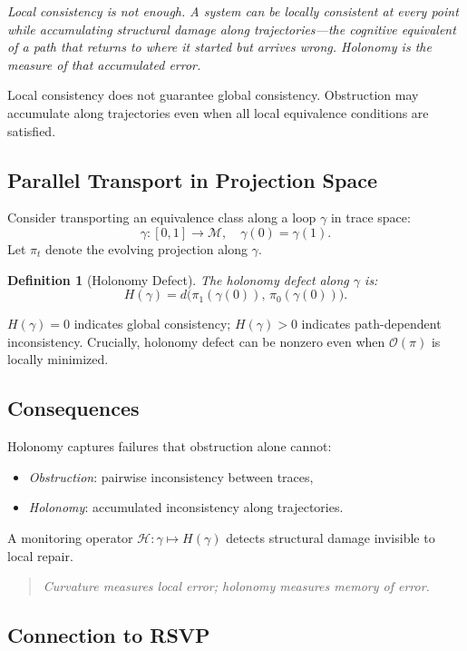 \documentclass[12pt,a4paper]{article}
\newtheorem{definition}[theorem]{Definition}
\begin{document}
\textit{Local consistency is not enough. A system can be locally consistent at every point while accumulating structural damage along trajectories---the cognitive equivalent of a path that returns to where it started but arrives wrong. Holonomy is the measure of that accumulated error.}

Local consistency does not guarantee global consistency. Obstruction may accumulate along trajectories even when all local equivalence conditions are satisfied.

\subsection{Parallel Transport in Projection Space}

Consider transporting an equivalence class along a loop $\gamma$ in trace space:
\[
\gamma : [0,1] \to \mathcal{M}, \quad \gamma(0) = \gamma(1).
\]
Let $\pi_t$ denote the evolving projection along $\gamma$.

\begin{definition}[Holonomy Defect]
The holonomy defect along $\gamma$ is:
\[
H(\gamma) = d\bigl(\pi_1(\gamma(0)),\, \pi_0(\gamma(0))\bigr).
\]
\end{definition}

$H(\gamma) = 0$ indicates global consistency; $H(\gamma) > 0$ indicates path-dependent inconsistency. Crucially, holonomy defect can be nonzero even when $\mathcal{O}(\pi)$ is locally minimized.

\subsection{Consequences}

Holonomy captures failures that obstruction alone cannot:
\begin{itemize}[noitemsep]
\item \emph{Obstruction}: pairwise inconsistency between traces,
\item \emph{Holonomy}: accumulated inconsistency along trajectories.
\end{itemize}

A monitoring operator $\mathcal{H} : \gamma \mapsto H(\gamma)$ detects structural damage invisible to local repair.

\begin{quote}
\emph{Curvature measures local error; holonomy measures memory of error.}
\end{quote}

\subsection{Connection to RSVP}
\end{document}
